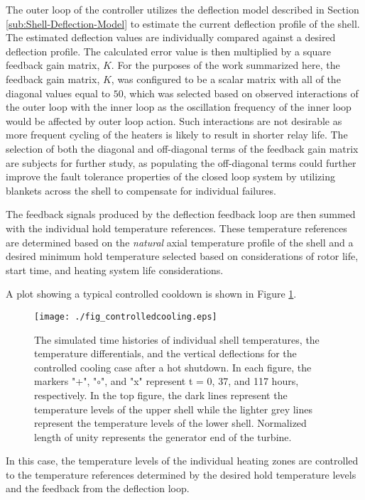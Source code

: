 \documentclass[a4paper, 10pt, conference]{ieeeconf}      %
\begin{document}
The outer loop of the controller utilizes the deflection model described in Section \ref{sub:Shell-Deflection-Model} to estimate the current deflection profile of the shell. The estimated deflection values are individually compared against a desired deflection profile. The calculated error value is then multiplied by a square feedback gain matrix, $K$. For the purposes of the work summarized here, the feedback gain matrix, $K$, was configured to be a scalar matrix with all of the diagonal values equal to $50$, which was selected based on observed interactions of the outer loop with the inner loop as the oscillation frequency of the inner loop would be affected by outer loop action. Such interactions are not desirable as more frequent cycling of the heaters is likely to result in shorter relay life. The selection of both the diagonal and off-diagonal terms of the feedback gain matrix are subjects for further study, as populating the off-diagonal terms could further improve the fault tolerance properties of the closed loop system by utilizing blankets across the shell to compensate for individual failures. 

The feedback signals produced by the deflection feedback loop are then summed with the individual hold temperature references. These temperature references are determined based on the \emph{natural} axial temperature profile of the shell and a desired minimum hold temperature selected based on considerations of rotor life, start time, and heating system life considerations. 

A plot showing a typical controlled cooldown is shown in Figure \ref{fig:Controlled-results}. 
\begin{figure}
\centering{}\texttt{[image: ./fig\_controlledcooling.eps]}
\caption{\label{fig:Controlled-results}The simulated time histories of individual shell temperatures, the temperature differentials, and the vertical deflections for the controlled cooling case after a hot shutdown. In each figure, the markers "+", "$\circ$", and "x" represent t = 0, 37, and 117 hours, respectively. In the top figure, the dark lines represent the temperature levels of the upper shell while the lighter grey lines represent the temperature levels of the lower shell. Normalized length of unity represents the generator end of the turbine.}
\end{figure} 
In this case, the temperature levels of the individual heating zones are controlled to the temperature references determined by the desired hold temperature levels and the feedback from the deflection loop. 
\end{document}

